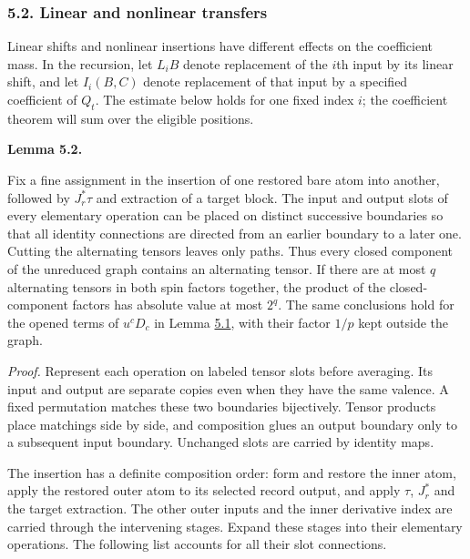 \documentclass[
  english,
  11pt,
  reqno]{amsart}
\makeatletter
\newcommand{\pandocstatementheading}[1]{%
  \par\addpenalty{\@beginparpenalty}%
  \addvspace{.5\baselineskip plus .2\baselineskip minus .2\baselineskip}%
  {\normalfont\bfseries #1\par}%
  \nobreak\@afterindenttrue\@afterheading
}
\makeatother
\begin{document}
\protect{}\label{sec:es-transfers}

\subsubsection{5.2. Linear and nonlinear
transfers}\label{linear-and-nonlinear-transfers}

Linear shifts and nonlinear insertions have different effects on the
coefficient mass. In the recursion, let \(L_iB\) denote replacement of
the \(i\)th input by its linear shift, and let \(I_i(B,C)\) denote
replacement of that input by a specified coefficient of \(Q_t\). The
estimate below holds for one fixed index \(i\); the coefficient theorem
will sum over the eligible positions.

\pandocstatementheading{\protect{}\label{lem:es-directed-wires}Lemma 5.2.}

Fix a fine assignment in the insertion of one restored bare atom into
another, followed by \(J_r^*\tau\) and extraction of a target block. The
input and output slots of every elementary operation can be placed on
distinct successive boundaries so that all identity connections are
directed from an earlier boundary to a later one. Cutting the
alternating tensors leaves only paths. Thus every closed component of
the unreduced graph contains an alternating tensor. If there are at most
\(q\) alternating tensors in both spin factors together, the product of
the closed-component factors has absolute value at most \(2^q\). The
same conclusions hold for the opened terms of \(u^cD_c\) in Lemma
\hyperref[lem:es-opening]{5.1}, with their factor \(1/p\) kept outside
the graph.

\emph{Proof.} Represent each operation on labeled tensor slots before
averaging. Its input and output are separate copies even when they have
the same valence. A fixed permutation matches these two boundaries
bijectively. Tensor products place matchings side by side, and
composition glues an output boundary only to a subsequent input
boundary. Unchanged slots are carried by identity maps.

The insertion has a definite composition order: form and restore the
inner atom, apply the restored outer atom to its selected record output,
and apply \(\tau\), \(J_r^*\) and the target extraction. The other outer
inputs and the inner derivative index are carried through the
intervening stages. Expand these stages into their elementary
operations. The following list accounts for all their slot connections.
\end{document}

